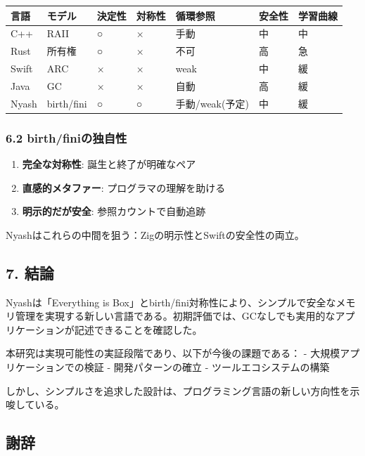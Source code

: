 \documentclass[
]{article}
\providecommand{\tightlist}{%
  \setlength{\itemsep}{0pt}\setlength{\parskip}{0pt}}
\begin{document}
\begin{longtable}[]{@{}lllllll@{}}
\toprule\noalign{}
言語 & モデル & 決定性 & 対称性 & 循環参照 & 安全性 & 学習曲線 \\
\midrule\noalign{}
\endhead
\bottomrule\noalign{}
\endlastfoot
C++ & RAII & ○ & × & 手動 & 中 & 中 \\
Rust & 所有権 & ○ & × & 不可 & 高 & 急 \\
Swift & ARC & × & × & weak & 中 & 緩 \\
Java & GC & × & × & 自動 & 高 & 緩 \\
Nyash & birth/fini & ○ & ○ & 手動/weak(予定) & 中 & 緩 \\
\end{longtable}

\hypertarget{birthfiniux306eux72ecux81eaux6027}{%
\subsubsection{6.2
birth/finiの独自性}\label{birthfiniux306eux72ecux81eaux6027}}

\begin{enumerate}
\def\labelenumi{\arabic{enumi}.}
\tightlist
\item
  \textbf{完全な対称性}: 誕生と終了が明確なペア
\item
  \textbf{直感的メタファー}: プログラマの理解を助ける
\item
  \textbf{明示的だが安全}: 参照カウントで自動追跡
\end{enumerate}

Nyashはこれらの中間を狙う：Zigの明示性とSwiftの安全性の両立。

\hypertarget{ux7d50ux8ad6}{%
\subsection{7. 結論}\label{ux7d50ux8ad6}}

Nyashは「Everything is
Box」とbirth/fini対称性により、シンプルで安全なメモリ管理を実現する新しい言語である。初期評価では、GCなしでも実用的なアプリケーションが記述できることを確認した。

本研究は実現可能性の実証段階であり、以下が今後の課題である： -
大規模アプリケーションでの検証 - 開発パターンの確立 -
ツールエコシステムの構築

しかし、シンプルさを追求した設計は、プログラミング言語の新しい方向性を示唆している。

\hypertarget{ux8b1dux8f9e}{%
\subsection{謝辞}\label{ux8b1dux8f9e}}
\end{document}
